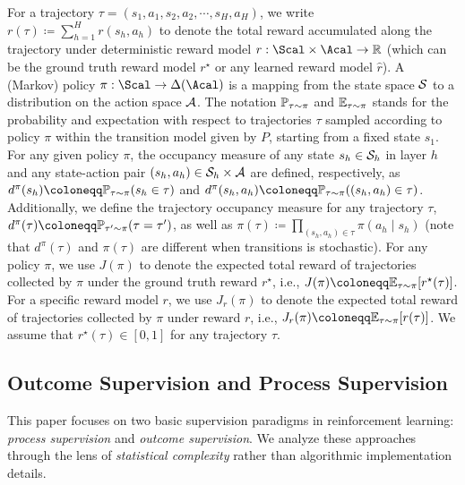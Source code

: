 \documentclass{article}
\begin{document}
For a trajectory $\tau = (s_1, a_1, s_2, a_2, \cdots, s_H, a_H)$, we write $r(\tau)\coloneqq \sum_{h=1}^H r(s_h, a_h)$ to denote the total reward accumulated along the trajectory under deterministic reward model $r:\Scal\times \Acal\to\RR$ (which can be the ground truth reward model $r^\star$ or any learned reward model $\widehat r$). A (Markov) policy $\pi: \Scal \to \Delta(\Acal)$ is a mapping from the state space $\mathcal{S}$ to a distribution on the action space $\mathcal{A}$. The notation $\mathbb{P}_{\tau\sim \pi}$ and $\mathbb{E}_{\tau\sim \pi}$ stands for the probability and expectation with respect to trajectories $\tau$ sampled according to policy $\pi$ within the transition model given by $P$, starting from a fixed state $s_1$. For any given policy $\pi$, the occupancy measure of any state $s_h\in \mathcal{S}_h$ in layer $h$ and any state-action pair $(s_h, a_h)\in \mathcal{S}_h\times\mathcal{A}$ are defined, respectively, as $d^\pi(s_h) \coloneqq \PP_{\tau\sim \pi} (s_h\in \tau)$ and $d^\pi(s_h, a_h) \coloneqq \PP_{\tau\sim \pi} ((s_h, a_h)\in \tau)$.
Additionally, we define the trajectory occupancy measure for any trajectory $\tau$, $d^\pi(\tau) \coloneqq \PP_{\tau'\sim \pi}(\tau = \tau')$, as well as $\pi(\tau) \coloneqq \prod_{(s_h, a_h)\in \tau} \pi(a_h \mid s_h)$ (note that $d^\pi(\tau)$ and $\pi(\tau)$ are different when transitions is stochastic). For any policy $\pi$, we use $J(\pi)$ to denote the expected total reward of trajectories collected by $\pi$ under the ground truth reward $r^\star$, i.e., $J(\pi) \coloneqq \EE_{\tau\sim \pi}[r^\star(\tau)]$.
For a specific reward model $r$, we use $J_{r}(\pi)$ to denote the expected total reward of trajectories collected by $\pi$ under reward $r$, i.e., $J_{r}(\pi) \coloneqq \EE_{\tau\sim \pi}[r(\tau)]$. We assume that $r^\star(\tau)\in [0,1]$ for any trajectory $\tau$.

\subsection{Outcome Supervision and Process Supervision}\label{sec: prem-reward}

This paper focuses on two basic supervision paradigms in reinforcement learning: \emph{process supervision} and \emph{outcome supervision}. We analyze these approaches through the lens of \emph{statistical complexity} rather than algorithmic implementation details. 
\end{document}
